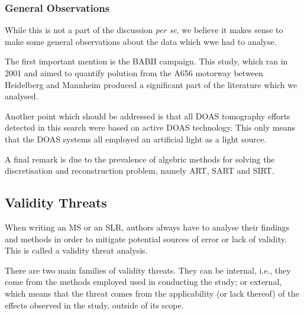 \subsubsection{General Observations}
\label{ssub:general_observations}

While this is not a part of the discussion \emph{per se}, we believe it
makes sense to make some general observations about the data which wwe
had to analyse.

The first important mention is the BABII campaign. This study, which ran
in 2001 and aimed to quantify polution from the A656 motorway between
Heidelberg and Mannheim produced a significant part of the literature
which we analysed.

Another point which should be addressed is that all DOAS tomography
efforts detected in this search were based on active DOAS technology.
This only means that the DOAS systems all employed an artificial light
as a light source.

A final remark is due to the prevalence of algebric methods for
solving the discretisation and reconstruction problem, namely ART, SART
and SIRT. 

\subsection{Validity Threats}
\label{sub:validity_threats}

When writing an MS or an SLR, authors always have to analyse their
findings and methods in order to mitigate potential sources of error or
lack of validity. This is called a validity threat analysis.

There are two main families of validity threats. They can be internal,
i.e., they come from the methods employed used in conducting the study;
or external, which means that the threat comes from the applicability
(or lack thereof) of the effects observed in the study, outside of its
scope.

